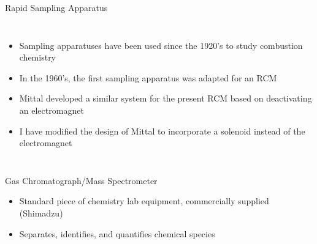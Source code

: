 \documentclass{beamer}
\begin{document}
\begin{frame}{Rapid Sampling Apparatus}
    \begin{columns}
            \begin{itemize}
                \item<1-> Sampling apparatuses have been used since the 1920's to study combustion chemistry
                \item<2-> In the 1960's, the first sampling apparatus was adapted for an RCM
                \item<3-> Mittal developed a similar system for the present RCM based on deactivating an electromagnet
                \item<4-> I have modified the design of Mittal to incorporate a solenoid instead of the electromagnet
            \end{itemize}
            \begin{minipage}[c][8cm][c]{\textwidth}
            \end{minipage}
    \end{columns}
\end{frame}

\begin{frame}{Gas Chromatograph/Mass Spectrometer}
    \begin{itemize}
        \item Standard piece of chemistry lab equipment, commercially supplied (Shimadzu)
        \item Separates, identifies, and quantifies chemical species
    \end{itemize}
\end{frame}
\end{document}
